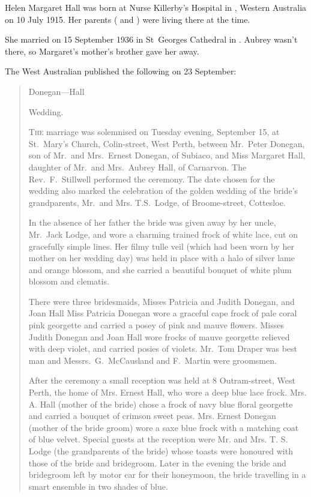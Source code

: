 
Helen Margaret Hall was born at Nurse Killerby's Hospital in , Western Australia\cite{HMHbirthNotice}
on 10 July 1915.\cite{HMHbirth}
Her parents ( and ) were living there at the time.

She married  on 15 September 1936 in St~Georges Cathedral in .\cite{MargPeterMarriage}
Aubrey wasn't there, so Margaret's mother's brother  gave her away.\cite{DoneganHallWedding1936}

The West Australian published the following on 23 September:\cite{DoneganHallWedding1936}

\begin{quotation}
Donegan---Hall

Wedding.

\textsc{The} marriage was solemnised on Tuesday evening, September 15, at St.\ Mary's Church, Colin-street, West Perth,
between Mr.\ Peter Donegan, son of Mr.\ and Mrs.\ Ernest Donegan, of Subiaco, and Miss Margaret Hall, daughter of Mr.\
and Mrs.\ Aubrey Hall, of Carnarvon. The Rev.\ F.\ Stillwell performed the ceremony. The date chosen for the wedding
also marked the celebration of the golden wedding of the bride's grandparents, Mr.\ and Mrs. T.S.\ Lodge, of
Broome-street, Cottesloe.

In the absence of her father the bride was given away by her uncle, Mr.\ Jack Lodge, and wore a charming trained frock of
white lace, cut on gracefully simple lines. Her filmy tulle veil (which had been worn by her mother on her wedding day)
was held in place with a halo of silver lame and orange blossom, and she carried a beautiful bouquet of white plum blossom and clematis.

There were three bridesmaids, Misses Patricia and Judith Donegan, and Joan Hall Miss Patricia Donegan wore a graceful cape frock of pale coral pink
georgette and carried a posey of pink and mauve flowers. Misses Judith Donegan and Joan Hall wore frocks of mauve
georgette relieved with deep violet, and carried posies of violets.
Mr.\ Tom Draper was best man and Messrs.\ G.\ McCausland and F.\ Martin were groomsmen.

After the ceremony a small reception was held at 8 Outram-street, West Perth, the home of Mrs. Ernest Hall,
who wore a deep blue lace frock. Mrs. A. Hall (mother of the bride) chose a frock of navy blue floral georgette and carried
a bouquet of crimson sweet peas. Mrs. Ernest Donegan (mother of the bride groom) wore a saxe blue frock with a matching coat of blue velvet.
Special guests at the reception were Mr. and Mrs. T. S. Lodge (the grandparents of the bride) whose toasts were honoured
with those of the bride and bridegroom. Later in the evening the bride and bridegroom left by motor car for their honeymoon,
the bride travelling in a smart ensemble in two shades of blue.
\end{quotation}

